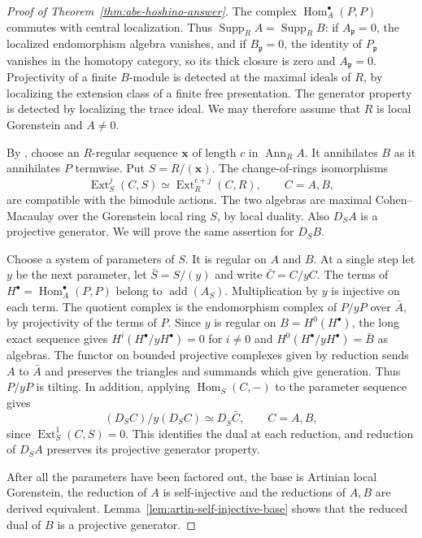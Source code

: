 \documentclass[12pt,a4paper,english,reqno]{amsart}
\numberwithin{equation}{section}
\theoremstyle{plain}
\theoremstyle{definition}
\begin{document}
\begin{proof}[Proof of Theorem~\ref{thm:abe-hoshino-answer}]
The complex $\operatorname{Hom}_A^\bullet(P,P)$ commutes with
central localization. Thus
$\operatorname{Supp}_R A=\operatorname{Supp}_R B$:
if $A_{\mathfrak p}=0$, the localized endomorphism algebra
vanishes, and if $B_{\mathfrak p}=0$, the identity of
$P_{\mathfrak p}$ vanishes in the homotopy category, so its
thick closure is zero and $A_{\mathfrak p}=0$.
Projectivity of a finite $B$-module is detected at the maximal
ideals of $R$, by localizing the extension class of a finite
free presentation. The generator property is detected by
localizing the trace ideal. We may therefore assume that $R$ is
local Gorenstein and $A\ne0$.

By \cite[Proposition~2.9]{AbeHoshino2009}, choose an
$R$-regular sequence $\boldsymbol x$ of length $c$ in
$\operatorname{Ann}_R A$. It annihilates $B$ as it annihilates
$P$ termwise. Put $S=R/(\boldsymbol x)$. The change-of-rings
isomorphisms
\[
 \operatorname{Ext}_S^j(C,S)
       \simeq\operatorname{Ext}_R^{c+j}(C,R),
 \qquad C=A,B,
\]
are compatible with the bimodule actions. The two algebras are
maximal Cohen--Macaulay over the Gorenstein local ring $S$,
by local duality. Also $D_SA$ is a projective generator. We will
prove the same assertion for $D_SB$.

Choose a system of parameters of $S$. It is regular on $A$
and $B$. At a single step let $y$ be the next parameter, let
$\bar S=S/(y)$ and write $\bar C=C/yC$. The terms of
$H^\bullet=\operatorname{Hom}_A^\bullet(P,P)$ belong to
$\operatorname{add}(A_S)$. Multiplication by $y$ is injective
on each term. The quotient complex is the endomorphism complex
of $P/yP$ over $\bar A$, by projectivity of the terms of $P$.
Since $y$ is regular on $B=H^0(H^\bullet)$, the long exact
sequence gives $H^i(H^\bullet/yH^\bullet)=0$ for $i\ne0$ and
$H^0(H^\bullet/yH^\bullet)=\bar B$ as algebras. The functor
on bounded projective complexes given by reduction sends
$A$ to $\bar A$ and preserves the triangles and summands
which give generation. Thus $P/yP$ is tilting. In addition,
applying $\operatorname{Hom}_S(C,-)$ to the parameter sequence
gives
\[
 (D_SC)/y(D_SC)\simeq D_{\bar S}\bar C,\qquad C=A,B,
\]
since $\operatorname{Ext}^1_S(C,S)=0$. This identifies the
dual at each reduction, and reduction of $D_SA$ preserves its
projective generator property.

After all the parameters have been factored out, the base is
Artinian local Gorenstein, the reduction of $A$ is self-injective
and the reductions of $A,B$ are derived equivalent.
Lemma~\ref{lem:artin-self-injective-base} shows that the
reduced dual of $B$ is a projective generator.


\end{proof}
\end{document}
